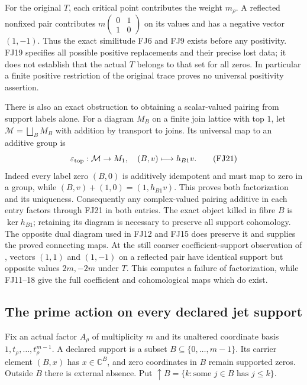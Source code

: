 \documentclass[11pt,a4paper]{article}
\theoremstyle{definition}\newtheorem{definition}[theorem]{Definition}
\newcommand{\C}{\mathbb C}\newcommand{\R}{\mathbb R}
\begin{document}
For the original $T$, each critical point contributes the weight
$m_\rho$. A reflected nonfixed pair contributes
$m\left(\begin{smallmatrix}0&1\\1&0\end{smallmatrix}\right)$ on
its values and has a negative vector $(1,-1)$. Thus the exact
similitude FJ6 and FJ9 exists before any positivity. FJ19 specifies
all possible positive replacements and their precise lost data; it
does not establish that the actual $T$ belongs to that set for all
zeros. In particular a finite positive restriction of the original
trace proves no universal positivity assertion.

There is also an exact obstruction to obtaining a scalar-valued
pairing from support labels alone. For a diagram $M_B$ on a finite
join lattice with top $1$, let $\mathcal M=\bigsqcup_BM_B$ with
addition by transport to joins. Its universal map to an additive
group is
\[
 \varepsilon_{\rm top}:\mathcal M\to M_1,
       \quad(B,v)\longmapsto h_{B1}v.
 \tag{FJ21}\label{fj:fj:top}
\]
Indeed every label zero $(B,0)$ is additively idempotent and must
map to zero in a group, while
$(B,v)+(1,0)=(1,h_{B1}v)$. This proves both factorization and its
uniqueness. Consequently any complex-valued pairing additive in each
entry factors through FJ21 in both entries. The exact object killed
in fibre $B$ is $\ker h_{B1}$; retaining its diagram is necessary
to preserve all support cohomology. The opposite dual diagram used
in FJ12 and FJ15 does preserve it and supplies the proved connecting
maps. At the still coarser coefficient-support observation of
\cite{FJdivisor}, vectors $(1,1)$ and $(1,-1)$ on a reflected pair
have identical support but opposite values $2m,-2m$ under $T$.
This computes a failure of factorization, while FJ11--18 give the
full coefficient and cohomological maps which do exist.

\subsection{The prime action on every declared jet support}
Fix an actual factor $A_\rho$ of multiplicity $m$ and its unaltered
coordinate basis $1,t_\rho,\ldots,t_\rho^{m-1}$. A declared support is
a subset $B\subseteq\{0,\ldots,m-1\}$. Its carrier element $(B,x)$
has $x\in\C^B$, and zero coordinates in $B$ remain supported zeros.
Outside $B$ there is external absence. Put
$\uparrow B=\{k:\text{some }j\in B\text{ has }j\le k\}$.
\end{document}

